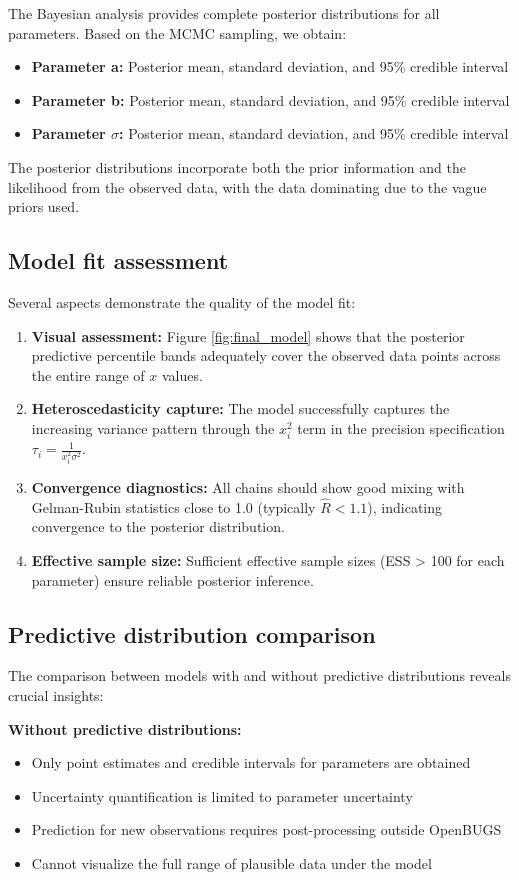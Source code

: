 The Bayesian analysis provides complete posterior distributions for all parameters. Based on the MCMC sampling, we obtain:
\begin{itemize}
\item \textbf{Parameter a:} Posterior mean, standard deviation, and 95\% credible interval
\item \textbf{Parameter b:} Posterior mean, standard deviation, and 95\% credible interval
\item \textbf{Parameter $\sigma$:} Posterior mean, standard deviation, and 95\% credible interval
\end{itemize}
The posterior distributions incorporate both the prior information and the likelihood from the observed data, with the data dominating due to the vague priors used.

\subsection{Model fit assessment}

Several aspects demonstrate the quality of the model fit:
\begin{enumerate}
\item \textbf{Visual assessment:} Figure \ref{fig:final_model} shows that the posterior predictive percentile bands adequately cover the observed data points across the entire range of $x$ values.
\item \textbf{Heteroscedasticity capture:} The model successfully captures the increasing variance pattern through the $x_i^2$ term in the precision specification $\tau_i = \frac{1}{x_i^2\sigma^2}$.
\item \textbf{Convergence diagnostics:} All chains should show good mixing with Gelman-Rubin statistics close to 1.0 (typically $\hat{R} < 1.1$), indicating convergence to the posterior distribution.
\item \textbf{Effective sample size:} Sufficient effective sample sizes (ESS > 100 for each parameter) ensure reliable posterior inference.
\end{enumerate}

\subsection{Predictive distribution comparison}

The comparison between models with and without predictive distributions reveals crucial insights:

\textbf{Without predictive distributions:}
\begin{itemize}
\item Only point estimates and credible intervals for parameters are obtained
\item Uncertainty quantification is limited to parameter uncertainty
\item Prediction for new observations requires post-processing outside OpenBUGS
\item Cannot visualize the full range of plausible data under the model
\end{itemize}


